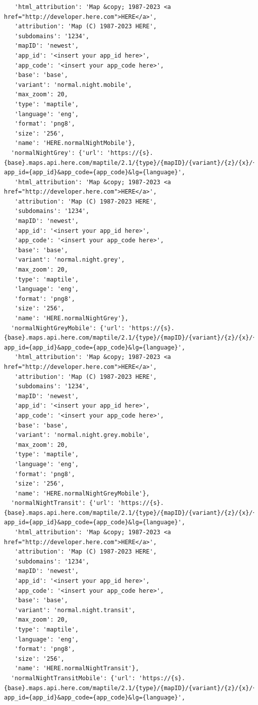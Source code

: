\documentclass[
  letterpaper,
  DIV=11,
  numbers=noendperiod]{scrreprt}
\begin{document}
\begin{verbatim}
   'html_attribution': 'Map &copy; 1987-2023 <a href="http://developer.here.com">HERE</a>',
   'attribution': 'Map (C) 1987-2023 HERE',
   'subdomains': '1234',
   'mapID': 'newest',
   'app_id': '<insert your app_id here>',
   'app_code': '<insert your app_code here>',
   'base': 'base',
   'variant': 'normal.night.mobile',
   'max_zoom': 20,
   'type': 'maptile',
   'language': 'eng',
   'format': 'png8',
   'size': '256',
   'name': 'HERE.normalNightMobile'},
  'normalNightGrey': {'url': 'https://{s}.{base}.maps.api.here.com/maptile/2.1/{type}/{mapID}/{variant}/{z}/{x}/{y}/{size}/{format}?app_id={app_id}&app_code={app_code}&lg={language}',
   'html_attribution': 'Map &copy; 1987-2023 <a href="http://developer.here.com">HERE</a>',
   'attribution': 'Map (C) 1987-2023 HERE',
   'subdomains': '1234',
   'mapID': 'newest',
   'app_id': '<insert your app_id here>',
   'app_code': '<insert your app_code here>',
   'base': 'base',
   'variant': 'normal.night.grey',
   'max_zoom': 20,
   'type': 'maptile',
   'language': 'eng',
   'format': 'png8',
   'size': '256',
   'name': 'HERE.normalNightGrey'},
  'normalNightGreyMobile': {'url': 'https://{s}.{base}.maps.api.here.com/maptile/2.1/{type}/{mapID}/{variant}/{z}/{x}/{y}/{size}/{format}?app_id={app_id}&app_code={app_code}&lg={language}',
   'html_attribution': 'Map &copy; 1987-2023 <a href="http://developer.here.com">HERE</a>',
   'attribution': 'Map (C) 1987-2023 HERE',
   'subdomains': '1234',
   'mapID': 'newest',
   'app_id': '<insert your app_id here>',
   'app_code': '<insert your app_code here>',
   'base': 'base',
   'variant': 'normal.night.grey.mobile',
   'max_zoom': 20,
   'type': 'maptile',
   'language': 'eng',
   'format': 'png8',
   'size': '256',
   'name': 'HERE.normalNightGreyMobile'},
  'normalNightTransit': {'url': 'https://{s}.{base}.maps.api.here.com/maptile/2.1/{type}/{mapID}/{variant}/{z}/{x}/{y}/{size}/{format}?app_id={app_id}&app_code={app_code}&lg={language}',
   'html_attribution': 'Map &copy; 1987-2023 <a href="http://developer.here.com">HERE</a>',
   'attribution': 'Map (C) 1987-2023 HERE',
   'subdomains': '1234',
   'mapID': 'newest',
   'app_id': '<insert your app_id here>',
   'app_code': '<insert your app_code here>',
   'base': 'base',
   'variant': 'normal.night.transit',
   'max_zoom': 20,
   'type': 'maptile',
   'language': 'eng',
   'format': 'png8',
   'size': '256',
   'name': 'HERE.normalNightTransit'},
  'normalNightTransitMobile': {'url': 'https://{s}.{base}.maps.api.here.com/maptile/2.1/{type}/{mapID}/{variant}/{z}/{x}/{y}/{size}/{format}?app_id={app_id}&app_code={app_code}&lg={language}',

\end{verbatim}
\end{document}
